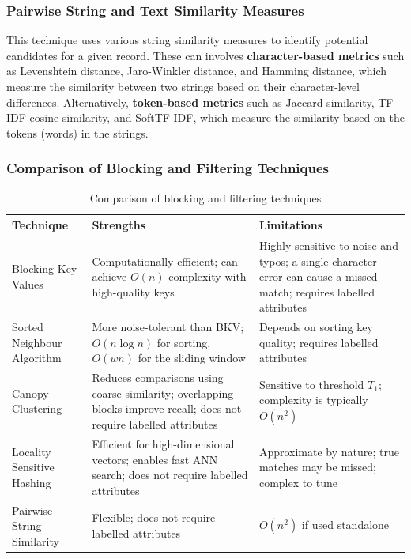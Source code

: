 \subsubsection{Pairwise String and Text Similarity Measures}\label{subsubsec:string_similarity}
This technique uses various string similarity measures to identify potential candidates for a given record.
These can involves \textbf{character-based metrics} such as Levenshtein distance, Jaro-Winkler distance, and Hamming distance, which measure the similarity between two strings based on their character-level differences.
Alternatively, \textbf{token-based metrics} such as Jaccard similarity, TF-IDF cosine similarity, and SoftTF-IDF, which measure the similarity based on the tokens (words) in the strings.\cite{sun2015comparative}

\subsubsection{Comparison of Blocking and Filtering Techniques}\label{subsubsec:blocking_comparison}

\begin{table}[H]
    \centering
    \small
    \renewcommand{\arraystretch}{1.4}
    \begin{tabularx}{\textwidth}{p{3.8cm} X X}
        \toprule
        \textbf{Technique} & \textbf{Strengths} & \textbf{Limitations} \\
        \midrule
        Blocking Key Values & Computationally efficient; can achieve $O(n)$ complexity with high-quality keys & Highly sensitive to noise and typos; a single character error can cause a missed match; requires labelled attributes\\
        Sorted Neighbour Algorithm & More noise-tolerant than BKV; $O(n \log n)$ for sorting, $O(wn)$ for the sliding window & Depends on sorting key quality; requires labelled attributes \\
        Canopy Clustering & Reduces comparisons using coarse similarity; overlapping blocks improve recall; does not require labelled attributes & Sensitive to threshold $T_1$; complexity is typically $O(n^2)$ \\
        Locality Sensitive Hashing & Efficient for high-dimensional vectors; enables fast ANN search; does not require labelled attributes & Approximate by nature; true matches may be missed; complex to tune \\
        Pairwise String Similarity & Flexible; does not require labelled attributes & $O(n^2)$ if used standalone \\
        \bottomrule
    \end{tabularx}
    \caption{Comparison of blocking and filtering techniques}
    \label{tab:blocking_comparison}
\end{table}

